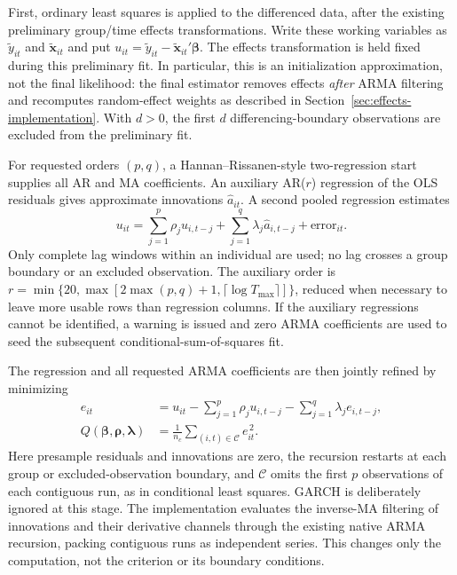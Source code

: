 \documentclass[12pt]{article}
\begin{document}
First, ordinary least squares is applied to the differenced data, after the
existing preliminary group/time effects transformations. Write these working
variables as $\widetilde y_{it}$ and $\widetilde{\mathbf x}_{it}$ and put
$u_{it}=\widetilde y_{it}-\widetilde{\mathbf x}_{it}'\boldsymbol\beta$.
The effects transformation is held fixed during this preliminary fit. In
particular, this is an initialization approximation, not the final likelihood:
the final estimator removes effects \emph{after} ARMA filtering and recomputes
random-effect weights as described in Section~\ref{sec:effects-implementation}.
With $d>0$, the first $d$ differencing-boundary observations are excluded from
the preliminary fit.

For requested orders $(p,q)$, a Hannan--Rissanen-style two-regression start
\cite{hannan1982recursive} supplies all AR and MA coefficients. An auxiliary
AR($r$) regression of the OLS residuals gives approximate innovations
$\widehat a_{it}$. A second pooled regression estimates
\[
 u_{it}=\sum_{j=1}^{p}\rho_j u_{i,t-j}
       +\sum_{j=1}^{q}\lambda_j\widehat a_{i,t-j}
       +\text{error}_{it}.
\]
Only complete lag windows within an individual are used; no lag crosses a
group boundary or an excluded observation. The auxiliary order is
$r=\min\{20,\max[2\max(p,q)+1,\lceil\log T_{\max}\rceil]\}$, reduced when
necessary to leave more usable rows than regression columns. If the auxiliary
regressions cannot be identified, a warning is issued and zero ARMA
coefficients are used to seed the subsequent conditional-sum-of-squares fit.

The regression and all requested ARMA coefficients are then jointly refined by
minimizing
\begin{align}
 e_{it}
 &=u_{it}-\sum_{j=1}^{p}\rho_j u_{i,t-j}
          -\sum_{j=1}^{q}\lambda_j e_{i,t-j},\\
 Q(\boldsymbol\beta,\boldsymbol\rho,\boldsymbol\lambda)
 &=\frac{1}{n_c}\sum_{(i,t)\in\mathcal C}e_{it}^{\,2}.
\end{align}
Here presample residuals and innovations are zero, the recursion restarts at
each group or excluded-observation boundary, and $\mathcal C$ omits the first
$p$ observations of each contiguous run, as in conditional least squares.
GARCH is deliberately ignored at this stage.
The implementation evaluates the inverse-MA filtering of innovations and
their derivative channels through the existing native ARMA recursion,
packing contiguous runs as independent series. This changes only the
computation, not the criterion or its boundary conditions.
\end{document}

